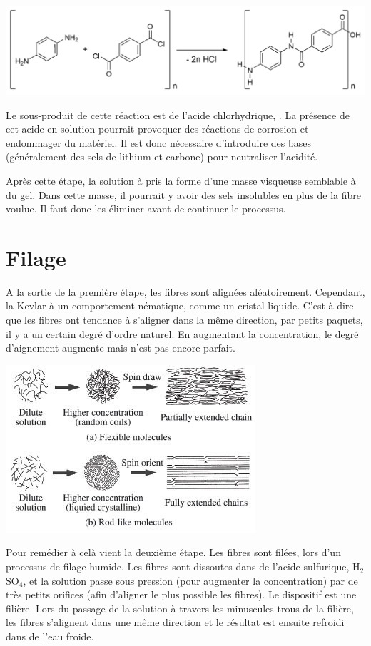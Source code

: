 \includegraphics[scale=0.215]{Schema/Kevlar_chemical_synthesis.png}

Le sous-produit de cette réaction est de l'acide chlorhydrique, . La présence de cet acide en solution pourrait provoquer des réactions de corrosion et endommager du matériel. Il est donc nécessaire d'introduire des bases (généralement des sels de lithium et carbone) pour neutraliser l'acidité.

Après cette étape, la solution à pris la forme d'une masse visqueuse semblable à du gel. Dans cette masse, il pourrait y avoir des sels insolubles en plus de la fibre voulue. Il faut donc les éliminer avant de continuer le processus.
		
\section{Filage}
	
A la sortie de la première étape, les fibres sont alignées aléatoirement. Cependant, la Kevlar à un comportement nématique, comme un cristal liquide. C'est-à-dire que les fibres ont tendance à s'aligner dans la même direction, par petits paquets, il y a un certain degré d'ordre naturel. En augmentant la concentration, le degré d'aignement augmente mais n'est pas encore parfait.

\begin{center}
\includegraphics[scale=0.72]{Schema/kevlar_1.jpg}
\end{center}

Pour remédier à celà vient la deuxième étape. Les fibres sont filées, lors d'un processus de filage humide. Les fibres sont dissoutes dans de l'acide sulfurique, H$_2$SO$_4$, et la solution passe sous pression (pour augmenter la concentration) par de très petits orifices (afin d'aligner le plus possible les fibres). Le dispositif est une filière. Lors du passage de la solution à travers les minuscules trous de la filière, les fibres s'alignent dans une même direction et le résultat est ensuite refroidi dans de l'eau froide. 

